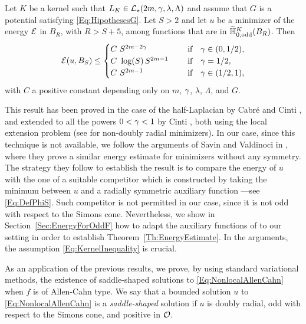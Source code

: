 \begin{theorem}
	\label{Th:EnergyEstimate} 
	Let $K$ be a kernel such that $L_K\in \mathcal{L}_\star(2m, \gamma, \lambda, \Lambda)$ and assume that $G$ is a potential satisfying \eqref{Eq:HipothesesG}. Let $S>2$ and let $u$ be a minimizer of the energy $\mathcal{E}$ in $B_{R}$, with $R>S+5$, among functions that are in $\widetilde{\mathbb{H}}^K_{0, \mathrm{odd}}(B_R)$. Then
	$$ \mathcal{E} (u,B_S) \leq \begin{cases}
	C \ S^{2m-2\gamma}\ \ \ \ &\textrm{if } \ \ \gamma\in(0,1/2),\\
	C\ \log(S)\,S^{2m-1}\ \ \ \ &\textrm{if } \ \ \gamma=1/2,\\
	C \ S^{2m-1}\ \ \ \ &\textrm{if } \ \ \gamma\in(1/2,1),\\
	\end{cases} $$
	with $C$ a positive constant depending only on $m$, $\gamma$, $\lambda$, $\Lambda$, and $G$.
\end{theorem}



This result has been proved in the case of the half-Laplacian by Cabré and Cinti \cite{CabreCinti-EnergyHalfL}, and extended to all the powers $0<\gamma<1$ by Cinti \cite{Cinti-Saddle2}, both using the local extension problem (see \cite{CabreCinti-SharpEnergy} for non-doubly radial minimizers). In our case, since this technique is not available, we follow the arguments of Savin and Valdinoci in \cite{SavinValdinoci-EnergyEstimate}, where they prove a similar energy estimate for minimizers without any symmetry. The strategy they follow to establish the result is to compare the energy of $u$ with the one of a suitable competitor which is constructed by taking the minimum between $u$ and a radially symmetric auxiliary function ---see \eqref{Eq:DefPhiS}. Such competitor is not permitted in our case, since it is not odd with respect to the Simons cone. Nevertheless, we show in Section~\ref{Sec:EnergyForOddF} how to adapt the auxiliary functions of \cite{SavinValdinoci-EnergyEstimate} to our setting in order to establish Theorem~\ref{Th:EnergyEstimate}. In the arguments, the assumption \eqref{Eq:KernelInequality} is crucial.


As an application of the previous results, we prove, by using standard variational methods, the existence of saddle-shaped solutions to  \eqref{Eq:NonlocalAllenCahn} when $f$ is of Allen-Cahn type. We say that a bounded solution $u$ to \eqref{Eq:NonlocalAllenCahn} is a \emph{saddle-shaped} solution if $u$ is doubly radial, odd with respect to the Simons cone, and positive in $\mathcal{O}$. 

